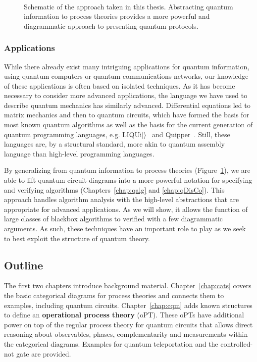 \begin{figure}[t]
\begin{align*}

\end{align*}
\caption[Schematic of process theories and categorical diagrams.]{Schematic of the approach taken in this thesis. Abstracting quantum information to process theories provides a more powerful and diagrammatic approach to presenting quantum protocols.}
\label{fig:overview}
\end{figure}


\subsubsection*{Applications} While there already exist many intriguing applications for quantum information, using quantum computers or quantum communications networks, our knowledge of these applications is often based on isolated techniques. As it has become necessary to consider more advanced applications, the language we have used to describe quantum mechanics has similarly advanced. Differential equations led to matrix mechanics and then to quantum circuits, which have formed the basis for most known quantum algorithms as well as the basis for the current generation of quantum programming languages, e.g. LIQUi$|\rangle$~\cite{wecker2014liqui} and Quipper~\cite{green2013quipper}. Still, these languages are, by a structural standard, more akin to quantum assembly language than high-level programming languages. 

By generalizing from quantum information to process theories (Figure~\ref{fig:overview}), we are able to lift quantum circuit diagrams into a more powerful notation for specifying and verifying algorithms (Chapters~\ref{chap:qalg} and \ref{chap:qDisCo}). This approach handles algorithm analysis with the high-level abstractions that are appropriate for advanced applications. As we will show, it allows the function of large classes of blackbox algorithms to verified with a few diagrammatic arguments. As such, these techniques have an important role to play as we seek to best exploit the structure of quantum theory. 

\subsection*{Outline}

The first two chapters introduce background material. Chapter~\ref{chap:cats} covers the basic categorical diagrams for process theories and connects them to examples, including quantum circuits. Chapter~\ref{chap:cqm} adds known structures to define an \textbf{operational process theory} (oPT). These oPTs have additional power on top of the regular process theory for quantum circuits that allows direct reasoning about observables, phases, complementarity and measurements within the categorical diagrams. Examples for quantum teleportation and the controlled-not gate are provided.


